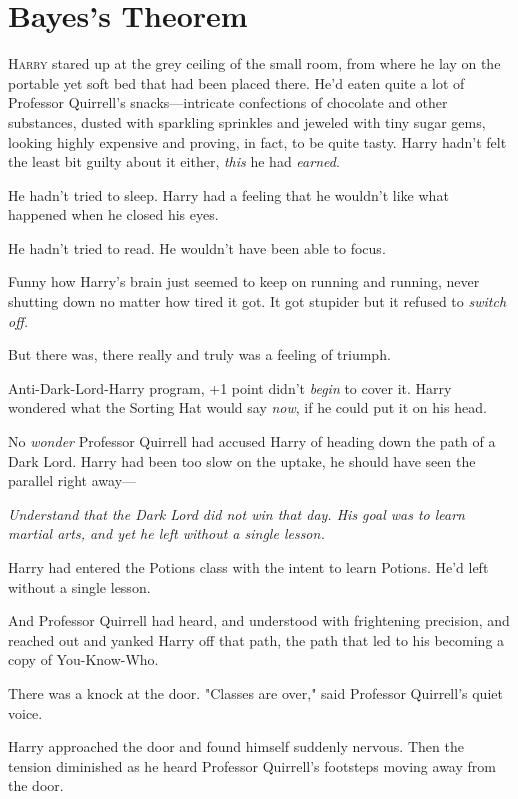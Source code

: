 \chapter{Bayes's Theorem}

\lettrine{H}{arry} stared up at the grey ceiling of the small room, from where he lay on the
portable yet soft bed that had been placed there. He'd eaten quite a lot of
Professor Quirrell's snacks---intricate confections of chocolate and other
substances, dusted with sparkling sprinkles and jeweled with tiny sugar gems,
looking highly expensive and proving, in fact, to be quite tasty. Harry hadn't
felt the least bit guilty about it either, \emph{this} he had \emph{earned}.

He hadn't tried to sleep. Harry had a feeling that he wouldn't like what
happened when he closed his eyes.

He hadn't tried to read. He wouldn't have been able to focus.

Funny how Harry's brain just seemed to keep on running and running, never
shutting down no matter how tired it got. It got stupider but it refused to
\emph{switch off.}

But there was, there really and truly was a feeling of triumph.

Anti-Dark-Lord-Harry program, +1 point didn't \emph{begin} to cover it. Harry
wondered what the Sorting Hat would say \emph{now}, if he could put it on his
head.

No \emph{wonder} Professor Quirrell had accused Harry of heading down the path
of a Dark Lord. Harry had been too slow on the uptake, he should have seen the
parallel right away---

\emph{Understand that the Dark Lord did not win that day. His goal was to learn
martial arts, and yet he left without a single lesson.}

Harry had entered the Potions class with the intent to learn Potions. He'd left
without a single lesson.

And Professor Quirrell had heard, and understood with frightening precision,
and reached out and yanked Harry off that path, the path that led to his
becoming a copy of You-Know-Who.

There was a knock at the door. "Classes are over," said Professor Quirrell's
quiet voice.

Harry approached the door and found himself suddenly nervous. Then the tension
diminished as he heard Professor Quirrell's footsteps moving away from the door.

